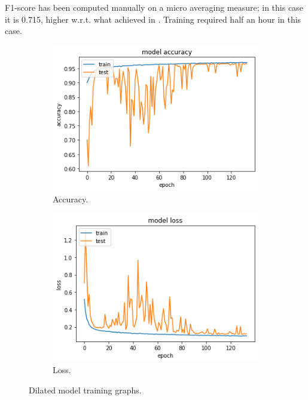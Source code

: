 \documentclass{article}
\begin{document}
F1-score has been computed manually on a micro averaging measure; in this case it is 0.715, higher w.r.t. what achieved in \cite{drossos2020sound}. Training required half an hour in this case.

\begin{figure}[H]
	\centering
	\begin{subfigure}{.5\textwidth}
		\centering
		\includegraphics[width=.9\linewidth]{./images/poly/dilated_acc.png}
		\caption{Accuracy.}
	\end{subfigure}%
	\begin{subfigure}{.5\textwidth}
		\centering
		\includegraphics[width=.9\linewidth]{./images/poly/dilated_loss.png}
		\caption{Loss.}
	\end{subfigure}
	\caption{Dilated model training graphs.}
	\label{fig:poly_dil_result}
\end{figure}
 
\end{document}
